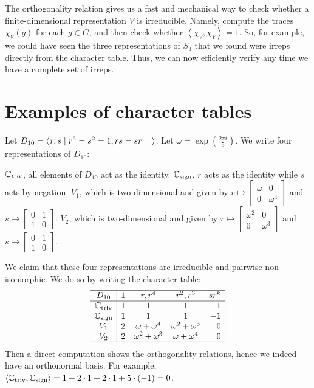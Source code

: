 The orthogonality relation gives us a fast and mechanical way to check
whether a finite-dimensional representation $V$ is irreducible.
Namely, compute the traces $\chi_V(g)$ for each $g \in G$,
and then check whether $\left< \chi_V, \chi_V \right> = 1$.
So, for example, we could have seen the three representations of
$S_3$ that we found were irreps directly from the character table.
Thus, we can now efficiently verify any time we have
a complete set of irreps.

\section{Examples of character tables}
\begin{example}
	Let $D_{10} = \left< r,s \mid r^5 = s^2 = 1, rs = sr^{-1} \right>$.
	Let $\omega = \exp(\frac{2\pi i}{5})$.
	We write four representations of $D_{10}$:
	\begin{itemize}
		\ii $\mathbb C_{\mathrm{triv}}$, all elements of $D_{10}$ act as the identity.
		\ii $\mathbb C_{\mathrm{sign}}$, $r$ acts as the identity while $s$ acts by negation.
		\ii $V_1$, which is two-dimensional and given by
		$r \mapsto \begin{bmatrix} \omega & 0 \\ 0 & \omega^4 \end{bmatrix}$
		and $s \mapsto \begin{bmatrix} 0 & 1 \\ 1 & 0 \end{bmatrix}$.
		\ii $V_2$, which is two-dimensional and given by
		$r \mapsto \begin{bmatrix} \omega^2 & 0 \\ 0 & \omega^3 \end{bmatrix}$
		and $s \mapsto \begin{bmatrix} 0 & 1 \\ 1 & 0 \end{bmatrix}$.
	\end{itemize}
	We claim that these four representations are irreducible
	and pairwise non-isomorphic.
	We do so by writing the character table:
	\[
		\begin{array}{|c|rccr|}
			\hline
			D_{10} & 1 & r, r^4 & r^2, r^3 & sr^k \\ \hline
			\mathbb C_{\mathrm{triv}} & 1 & 1 & 1 & 1 \\
			\mathbb C_{\mathrm{sign}} & 1 & 1 & 1 & -1 \\
			V_1 & 2 & \omega+\omega^4 & \omega^2+\omega^3 & 0 \\
			V_2 & 2 & \omega^2+\omega^3 & \omega+\omega^4 & 0 \\ \hline
		\end{array}
	\]
	Then a direct computation shows the orthogonality relations,
	hence we indeed have an orthonormal basis.
	For example, $\left< \mathbb C_{\mathrm{triv}}, \mathbb C_{\mathrm{sign}} \right> = 1 + 2 \cdot 1 + 2 \cdot 1 + 5 \cdot (-1) = 0$.
\end{example}

